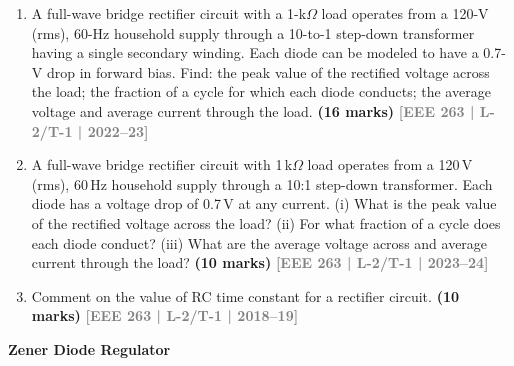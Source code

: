 \documentclass[12pt,a4paper]{article}
\newcommand{\yr}[1]{\hfill\textcolor{gray}{\small\textbf{[#1]}}}
\newcommand{\mk}[1]{\textcolor{orange!70!black}{\small\textbf{(#1 marks)}}}
\newcommand{\subtopic}[2]{%
  \vspace{10pt}
  \noindent\begin{tcolorbox}[colback=#1!8,colframe=#1,boxrule=0.6pt,arc=4pt,
    left=6pt,right=6pt,top=4pt,bottom=4pt]
    \small\bfseries\textcolor{#1}{#2}
  \end{tcolorbox}
  \vspace{2pt}
}
\begin{document}
\begin{enumerate}
\begin{center}
\begin{circuitikz}
    \end{circuitikz}
\end{center}
\mk{15} \yr{EEE 263 | L-2/T-1 | 2021--22}

\item A full-wave bridge rectifier circuit with a 1-k$\Omega$ load operates from a 120-V (rms), 60-Hz household supply through a 10-to-1 step-down transformer having a single secondary winding. Each diode can be modeled to have a 0.7-V drop in forward bias. Find: the peak value of the rectified voltage across the load; the fraction of a cycle for which each diode conducts; the average voltage and average current through the load.
\mk{16} \yr{EEE 263 | L-2/T-1 | 2022--23}

\item A full-wave bridge rectifier circuit with 1\,k$\Omega$ load operates from a 120\,V (rms), 60\,Hz household supply through a 10:1 step-down transformer. Each diode has a voltage drop of 0.7\,V at any current. (i) What is the peak value of the rectified voltage across the load? (ii) For what fraction of a cycle does each diode conduct? (iii) What are the average voltage across and average current through the load?
\mk{10} \yr{EEE 263 | L-2/T-1 | 2023--24}

\item Comment on the value of RC time constant for a rectifier circuit.
\mk{10} \yr{EEE 263 | L-2/T-1 | 2018--19}



\end{enumerate}

\subtopic{cA}{Zener Diode Regulator}
\label{sub:s1-zener}
\end{document}
